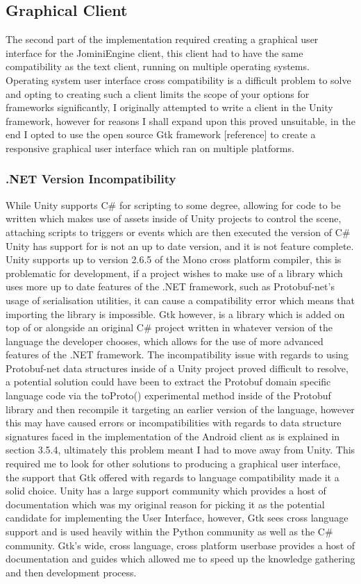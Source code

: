 \documentclass{article}
\begin{document}
\subsection{Graphical Client}
The second part of the implementation required creating a graphical user interface for the JominiEngine client, this client had to have the same compatibility as the text client, running on multiple operating systems. Operating system user interface cross compatibility is a difficult problem to solve and opting to creating such a client limits the scope of your options for frameworks significantly, I originally attempted to write a client in the Unity framework, however for reasons I shall expand upon this proved unsuitable, in the end I opted to use the open source Gtk framework [reference] to create a responsive graphical user interface which ran on multiple platforms.

\subsubsection{.NET Version Incompatibility}

While Unity supports C\# for scripting to some degree, allowing for code to be written which makes use of assets inside of Unity projects to control the scene, attaching scripts to triggers or events which are then executed the version of C\# Unity has support for is not an up to date version, and it is not feature complete. Unity supports up to version 2.6.5 of the Mono cross platform compiler, this is problematic for development, if a project wishes to make use of a library which uses more up to date features of the .NET framework, such as Protobuf-net’s usage of serialisation utilities, it can cause a compatibility error which means that importing the library is impossible. Gtk however, is a library which is added on top of or alongside an original C\# project written in whatever version of the language the developer chooses, which allows for the use of more advanced features of the .NET framework. The incompatibility issue with regards to using Protobuf-net data structures inside of a Unity project proved difficult to resolve, a potential solution could have been to extract the Protobuf domain specific language code via the toProto() experimental method inside of the Protobuf library and then recompile it targeting an earlier version of the language, however this may have caused errors or incompatibilities with regards to data structure signatures faced in the implementation of the Android client as is explained in section 3.5.4, ultimately this problem meant I had to move away from Unity. This required me to look for other solutions to producing a graphical user interface, the support that Gtk offered with regards to language compatibility made it a solid choice. Unity has a large support community which provides a host of documentation which was my original reason for picking it as the potential candidate for implementing the User Interface, however, Gtk sees cross language support and is used heavily within the Python community as well as the C\# community. Gtk’s wide, cross language, cross platform userbase provides a host of documentation and guides which allowed me to speed up the knowledge gathering and then development process.
\end{document}
